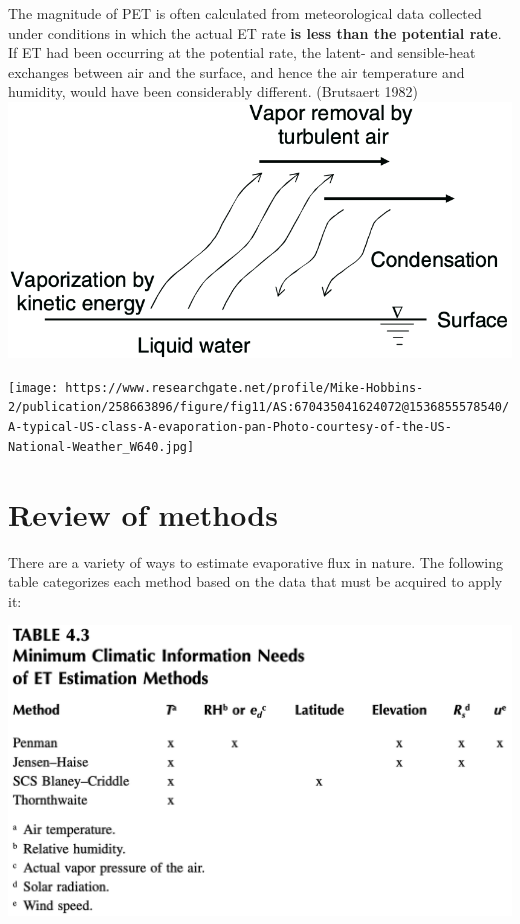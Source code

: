 \documentclass[
  letterpaper,
  DIV=11,
  numbers=noendperiod]{scrreprt}
\begin{document}
The magnitude of PET is often calculated from meteorological data
collected under conditions in which the actual ET rate \textbf{is less
than the potential rate}. If ET had been occurring at the potential
rate, the latent- and sensible-heat exchanges between air and the
surface, and hence the air temperature and humidity, would have been
considerably different. (Brutsaert 1982)
\includegraphics{archive/figures/brutsaert-fig4.1.png}

\texttt{[image: https://www.researchgate.net/profile/Mike-Hobbins-2/publication/258663896/figure/fig11/AS:670435041624072@1536855578540/A-typical-US-class-A-evaporation-pan-Photo-courtesy-of-the-US-National-Weather\_W640.jpg]}

\hypertarget{review-of-methods}{%
\section{Review of methods}\label{review-of-methods}}

There are a variety of ways to estimate evaporative flux in nature. The
following table categorizes each method based on the data that must be
acquired to apply it:

\includegraphics{archive/figures/trimble-table4.3.png}
\end{document}
